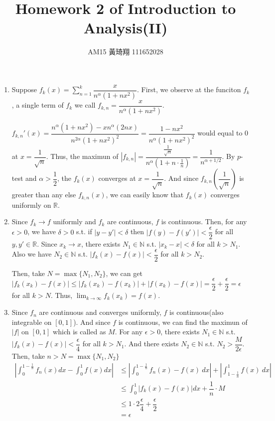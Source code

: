 \documentclass[12pt]{article}
\title{Homework 2 of Introduction to Analysis(II)}
\author{AM15 黃琦翔 111652028}
\begin{document}
\maketitle
\begin{enumerate}
    \item Suppose $f_k(x) = \displaystyle\sum_{n=1}^{k} \dfrac{x}{n^\alpha (1+nx^2)}$.
    First, we observe at the funciton $f_k$, a single term of $f_k$ we call $f_{k, n} = \dfrac{x}{n^{\alpha}(1+nx^2)}$.

    $f_{k, n}'(x) = \dfrac{n^{\alpha}(1+nx^2) - xn^{\alpha}(2nx)}{n^{2\alpha}(1+nx^2)^2} = \dfrac{1-nx^2}{n^{\alpha}(1+nx^2)^2}$ would equal to $0$ at $x = \dfrac{1}{\sqrt{n}}$.
    Thus, the maximun of $|f_{k, n}| = \dfrac{\frac{1}{\sqrt{n}}}{n^{\alpha}(1 + n \cdot \frac{1}{n})} = \dfrac{1}{n^{\alpha + 1/2}}$.
    By $p$-test and $\alpha> \dfrac{1}{2}$, the $f_k(x)$ converges at $x = \dfrac{1}{\sqrt{n}}$.
    And since $f_{k, n}(\dfrac{1}{\sqrt{n}})$ is greater than any else $f_{k, n}(x)$, 
    we can easily know that $f_k(x)$ converges uniformly on $\mathbb{R}$.

    \item Since $f_k \to f$ uniformly and $f_k$ are continuous, $f$ is continuous.
    Then, for any $\epsilon > 0$, we have $\delta > 0 $ s.t. if $|y - y'| < \delta$ then $|f(y) - f(y')| < \dfrac{\epsilon}{2}$ for all $y, y' \in \mathbb{R}$.
    Since $x_k \to x$, there exists $N_1 \in \mathbb{N}$ s.t. $|x_k - x| < \delta$ for all $k > N_1$.
    Also we have $N_2 \in \mathbb{N}$ s.t. $|f_k(x) - f(x)| < \dfrac{\epsilon}{2}$ for all $k > N_2$.

    Then, take $N  = \max\{ N_1, N_2\}$, we can get $|f_k(x_k) - f(x)| \leq |f_k(x_k) - f(x_k)| + |f(x_k) - f(x)| = \dfrac{\epsilon}{2} + \dfrac{\epsilon}{2} = \epsilon$ for all $k > N$.
    Thus, $\displaystyle\lim_{k\to\infty} f_k(x_k) = f(x)$.

    \item Since $f_n$ are continuous and converges uniformly, $f$ is continuous(also integrable on $[0, 1]$).
    And since $f$ is continuous, we can find the maximun of $|f|$ on $[0, 1]$ which is called as $M$.
    For any $\epsilon > 0$, there exists $N_1 \in \mathbb{N}$ s.t. $|f_k(x) - f(x)| < \dfrac{\epsilon}{4}$ for all $k > N_1$.
    And there exists $N_2 \in \mathbb{N}$ s.t. $N_2 > \dfrac{M}{2\epsilon}$.
    Then, take $n > N = \max\{N_1, N_2\}$ \begin{align*}
        \left|\int_0^{1-\frac{1}{n}} f_n(x) dx - \int_0^1 f(x) dx\right| &\leq \left|\int_{0}^{1-\frac{1}{n}} f_n(x) - f(x)\ dx\right| + \left|\int_{1-\frac{1}{n}}^{1} f(x)\ dx\right|\\
        &\leq \int_0^1 |f_k(x) - f(x)| dx + \dfrac{1}{n} \cdot M\\
        &\leq 1 \cdot 2\dfrac{\epsilon}{4} + \dfrac{\epsilon}{2}\\
        &= \epsilon
    \end{align*}


\end{enumerate}
\end{document}
